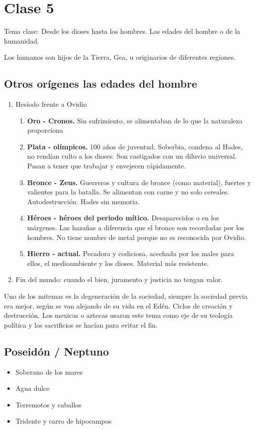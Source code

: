 \chapter{Clase 5}\label{ch:clase5}
Tema clase: Desde los dioses hasta los hombres. Las edades del hombre o de la humanidad.

Los humanos son hijos de la Tierra, Gea, u originarios de diferentes regiones.

\section{Otros orígenes las edades del hombre}
\begin{enumerate}
    \item Hesíodo frente a Ovidio
    \begin{enumerate}
        \item \textbf{Oro - Cronos.} Sin sufrimiento, se alimentaban de lo que la naturaleza proporciona
        \item \textbf{Plata - olímpicos.} 100 años de juventud. Soberbia, condena al Hades, no rendían culto a los dioses. Son castigados con un diluvio universal. Pasan a tener que trabajar y envejecen rápidamente.
        \item \textbf{Bronce - Zeus.} Guerreros y cultura de bronce (como material), fuertes y valientes para la batalla. Se alimentan con carne y no solo cereales. Autodestrucción. Hades sin memoria.
        \item \textbf{Héroes - héroes del periodo mítico.} Desaparecidos o en los márgenes. Las hazañas a diferencia que el bronce son recordadas por los hombres. No tiene nombre de metal porque no es reconocida por Ovidio.
        \item \textbf{Hierro - actual.} Pecadora y codiciosa, acechada por los males para ellos, el medioambiente y los dioses. Material más resistente.
    \end{enumerate}
    \item Fin del mundo: cuando el bien, juramento y justicia no tengan valor.
\end{enumerate}

Uno de los mitemas es la degeneración de la sociedad, siempre la sociedad previa era mejor, según se van alejando de su vida en el Edén. Ciclos de creación y destrucción. Los mexicas o aztecas usaron este tema como eje de su teología política y los sacrificios se hacían para evitar el fin.

\section{Poseidón / Neptuno}
\begin{itemize}
    \item Soberano de los mares
    \item Agua dulce
    \item Terremotos y caballos
    \item Tridente y carro de hipocampos
\end{itemize}

